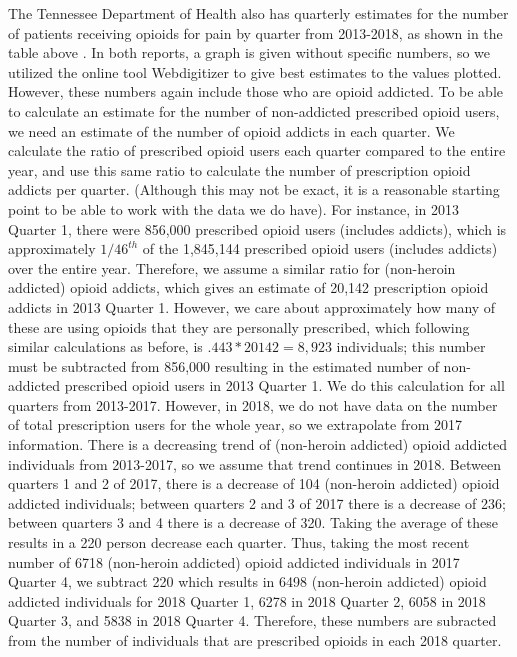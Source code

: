 \documentclass[12pt]{article}
\begin{document}
The Tennessee Department of Health also has quarterly estimates for the number of patients receiving opioids for pain by quarter from 2013-2018, as shown in the table above \cite{PDO, PDO2}. In both reports, a graph is given without specific numbers, so we utilized the online tool Webdigitizer to give best estimates to the values plotted. However, these numbers again include those who are opioid addicted. To be able to calculate an estimate for the number of non-addicted prescribed opioid users, we need an estimate of the number of opioid addicts in each quarter. We calculate the ratio of prescribed opioid users each quarter compared to the entire year, and use this same ratio to calculate the number of prescription opioid addicts per quarter.  (Although this may not be exact, it is a reasonable starting point to be able to work with the data we do have). For instance, in 2013 Quarter 1, there were 856,000 prescribed opioid users (includes addicts), which is approximately $1/46^{th}$ of the 1,845,144 prescribed opioid users (includes addicts) over the entire year. Therefore, we assume a similar ratio for (non-heroin addicted) opioid addicts, which gives an estimate of 20,142 prescription opioid addicts in 2013 Quarter 1. However, we care about approximately how many of these are using opioids that they are personally prescribed, which following similar calculations as before, is $.443*20142=8,923$ individuals; this number must be subtracted from 856,000 resulting in the estimated number of non-addicted prescribed opioid users in 2013 Quarter 1. We do this calculation for all quarters from 2013-2017. However, in 2018, we do not have data on the number of total prescription users for the whole year, so we extrapolate from 2017 information. There is a decreasing trend of (non-heroin addicted) opioid addicted individuals from 2013-2017, so we assume that trend continues in 2018. Between quarters 1 and 2 of 2017, there is a decrease of 104 (non-heroin addicted) opioid addicted individuals; between quarters 2 and 3 of 2017 there is a decrease of 236; between quarters 3 and 4 there is a decrease of 320. Taking the average of these results in a 220 person decrease each quarter. Thus, taking the most recent number of 6718 (non-heroin addicted) opioid addicted individuals in 2017 Quarter 4, we subtract 220 which results in 6498 (non-heroin addicted) opioid addicted individuals for 2018 Quarter 1, 6278 in 2018 Quarter 2, 6058 in 2018 Quarter 3, and 5838 in 2018 Quarter 4. Therefore, these numbers are subracted from the number of individuals that are prescribed opioids in each 2018 quarter.  \\
\end{document}
